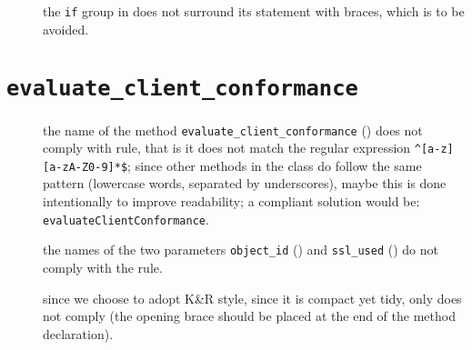 
\begin{description}
		
	\item [] 
		the \verb|if| group in  does not surround its statement with braces, which is to be avoided. 

\end{description}

	












































\section{\normalfont\texttt{evaluate\_client\_conformance}}
\begin{description}

	\item []
		the name of the method \verb|evaluate_client_conformance| () does not comply with rule, that is it does not match the regular expression \verb|^[a-z][a-zA-Z0-9]*$|; since other methods in the class do follow the same pattern (lowercase words, separated by underscores), maybe this is done intentionally to improve readability; a compliant solution would be: \texttt{evaluateClientConformance}. %
	
	\item []
		the names of the two parameters \verb|object_id| () and \verb|ssl_used| () do not comply with the rule. 
	
	\item []
		since we choose to adopt K\&R style, since it is compact yet tidy, only  does not comply (the opening brace should be placed at the end of the method declaration).
	
\end{description}


